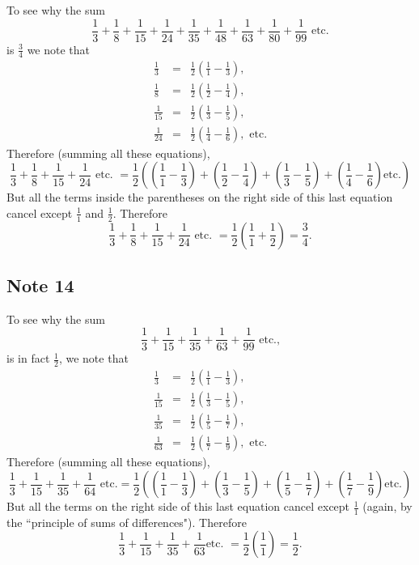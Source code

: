 \documentclass[polutonikogreek,english,twoside,openright]{article}
\begin{document}
To see why the sum 
$$\frac{1}{3} +
\frac{1}{8} + \frac{1}{15} + \frac{1}{24} + \frac{1}{35} + \frac{1}{48} +
\frac{1}{63} + \frac{1}{80} + \frac{1}{99}\mbox{ etc.}$$ is $\frac{3}{4}$
we note that
\begin{eqnarray*}
  \frac{1}{3} &  = & \frac{1}{2}\left(\frac{1}{1} - \frac{1}{3}\right),\\
  \frac{1}{8} & = & \frac{1}{2}\left(\frac{1}{2} - \frac{1}{4}\right),\\
  \frac{1}{15} & = & \frac{1}{2}\left(\frac{1}{3} - \frac{1}{5}\right),\\
  \frac{1}{24} & = & \frac{1}{2}\left(\frac{1}{4} - \frac{1}{6}\right), \mbox{ etc.}
\end{eqnarray*}
Therefore (summing all these equations),
$$\frac{1}{3} + \frac{1}{8} + \frac{1}{15} + \frac{1}{24} \mbox{ etc. } = 
\frac{1}{2}\left(\left(\frac{1}{1} - \frac{1}{3}\right) +
  \left(\frac{1}{2} - \frac{1}{4}\right) + \left(\frac{1}{3} -
    \frac{1}{5}\right) + \left(\frac{1}{4} - \frac{1}{6}\right)
  \mbox{etc.}\right)$$
But all the terms inside the parentheses on the
right side of this last equation cancel except $\frac{1}{1}$ and
$\frac{1}{2}$.  Therefore
$$ \frac{1}{3} + \frac{1}{8} + \frac{1}{15} + \frac{1}{24} \mbox{ etc. } = \frac{1}{2}\left(\frac{1}{1}  + \frac{1}{2}\right) = \frac{3}{4}.$$

\subsection*{Note 14}
\label{ctp14}

To see why the sum
$$\frac{1}{3} + \frac{1}{15} +
\frac{1}{35} + \frac{1}{63} + \frac{1}{99}\mbox{ etc.,}$$ is in fact $\frac{1}{2}$, we note that 
\begin{eqnarray*}
  \frac{1}{3} &  = & \frac{1}{2}\left(\frac{1}{1} - \frac{1}{3}\right),\\
  \frac{1}{15} & = & \frac{1}{2}\left(\frac{1}{3} - \frac{1}{5}\right),\\
  \frac{1}{35} & = & \frac{1}{2}\left(\frac{1}{5} - \frac{1}{7}\right),\\
  \frac{1}{63} & = & \frac{1}{2}\left(\frac{1}{7} - \frac{1}{9}\right), \mbox{ etc.}
\end{eqnarray*}
Therefore (summing all these equations),
$$\frac{1}{3} + \frac{1}{15} + \frac{1}{35} + \frac{1}{64} \mbox{ etc.} = 
\frac{1}{2}\left(\left(\frac{1}{1} - \frac{1}{3}\right) +
  \left(\frac{1}{3} - \frac{1}{5}\right) + \left(\frac{1}{5} -
    \frac{1}{7}\right) + \left(\frac{1}{7} - \frac{1}{9}\right)
  \mbox{etc.}\right)$$
But all the terms on the right side of this last equation cancel
except $\frac{1}{1}$ (again, by the ``principle of sums of
differences").  Therefore
$$ \frac{1}{3} + \frac{1}{15} + \frac{1}{35} + \frac{1}{63} \mbox{
  etc. } = \frac{1}{2}\left(\frac{1}{1}\right) = \frac{1}{2}.$$
\end{document}
